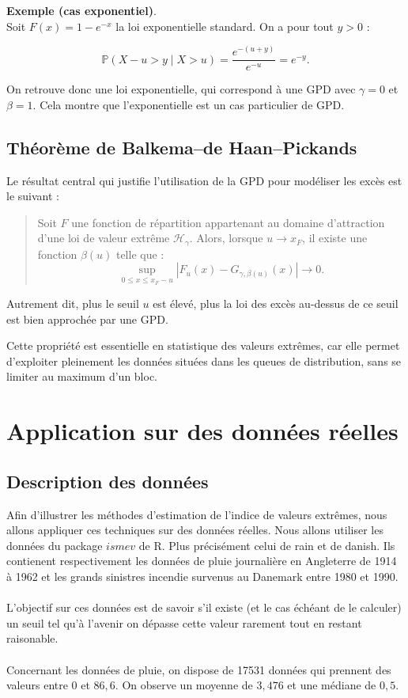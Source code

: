 \documentclass{article}
\theoremstyle{plain}
\theoremstyle{definition}
\theoremstyle{plain}
\begin{document}
\medskip
\textbf{Exemple (cas exponentiel)}.\\
Soit \(F(x) = 1 - e^{-x}\) la loi exponentielle standard. On a pour tout \(y > 0\) :

\[
\mathbb{P}(X - u > y \mid X > u) = \frac{e^{-(u + y)}}{e^{-u}} = e^{-y}.
\]

On retrouve donc une loi exponentielle, qui correspond à une GPD avec \(\gamma = 0\) et \(\beta = 1\). Cela montre que l’exponentielle est un cas particulier de GPD.

\subsection{Théorème de Balkema–de Haan–Pickands}

Le résultat central qui justifie l’utilisation de la GPD pour modéliser les excès est le suivant :

\begin{quote}
Soit \(F\) une fonction de répartition appartenant au domaine d’attraction d’une loi de valeur extrême \(\mathcal{H}_\gamma\). Alors, lorsque \(u \to x_F\), il existe une fonction \(\beta(u)\) telle que :
\[
\sup_{0 \leq x \leq x_F - u} \left| F_u(x) - G_{\gamma, \beta(u)}(x) \right| \to 0.
\]
\end{quote}

Autrement dit, plus le seuil \(u\) est élevé, plus la loi des excès au-dessus de ce seuil est bien approchée par une GPD.

\medskip
Cette propriété est essentielle en statistique des valeurs extrêmes, car elle permet d’exploiter pleinement les données situées dans les queues de distribution, sans se limiter au maximum d’un bloc.
\newpage
\section{Application sur des données réelles}
\subsection{Description des données}

Afin d'illustrer les méthodes d'estimation de l'indice de valeurs extrêmes, nous allons appliquer ces techniques sur des données réelles.
Nous allons utiliser les données du package $ismev$ de R. Plus précisément celui de rain et de danish. Ils contienent respectivement les données de pluie journalière en Angleterre de 1914 à 1962 et 
les grands sinistres incendie survenus au Danemark entre 1980 et 1990.
\\
\\
L'objectif sur ces données est de savoir s'il existe (et le cas échéant de le calculer) un seuil tel qu'à l'avenir on dépasse cette valeur rarement tout en restant raisonable.
\\
\\
Concernant les données de pluie, on dispose de 17531 données qui prennent des valeurs entre $0$ et $86,6$. On observe un moyenne de $3,476$ et une médiane de $0,5$.
\end{document}

